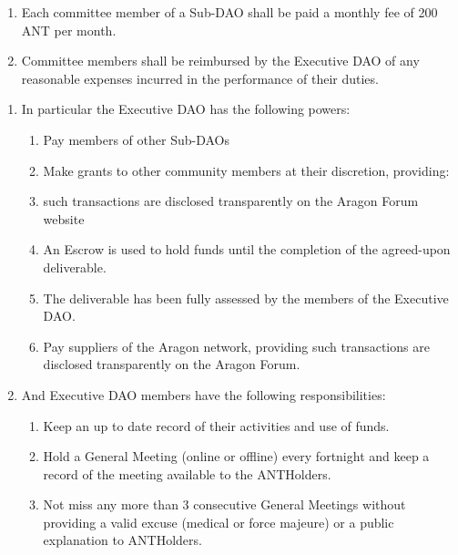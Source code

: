 \begin{enumerate}
\begin{enumerate}
		\begin{enumerate}
			\item Each committee member of a Sub-\ac{DAO} shall be paid a monthly fee of 200 ANT per month.
			\item Committee members shall be reimbursed by the Executive \ac{DAO} of any reasonable expenses incurred in the performance of their duties.
		\end{enumerate}
	\end{enumerate}
	
	\begin{enumerate}
		\begin{enumerate}
			\item In particular the Executive \ac{DAO} has the following powers:
			\begin{enumerate}
				\item Pay members of other Sub-\ac{DAO}s
				\item Make grants to other community members at their discretion, providing:
				\item such transactions are disclosed transparently on the Aragon Forum website
				\item An Escrow is used to hold funds until the completion of the agreed-upon deliverable.
				\item The deliverable has been fully assessed by the members of the Executive \ac{DAO}.
				\item Pay suppliers of the Aragon network, providing such transactions are disclosed transparently on the Aragon Forum.
			\end{enumerate}
			
			\item And Executive \ac{DAO} members have the following responsibilities:
			\begin{enumerate}
				\item Keep an up to date record of their activities and use of funds.
				\item Hold a General Meeting (online or offline) every fortnight and keep a record of the meeting available to the \glspl{ANTHolder}.
				\item Not miss any more than 3 consecutive General Meetings without providing a valid excuse (medical or force majeure) or a public explanation to \glspl{ANTHolder}.
			\end{enumerate}

		\end{enumerate}
	

\end{enumerate}
\end{enumerate}
